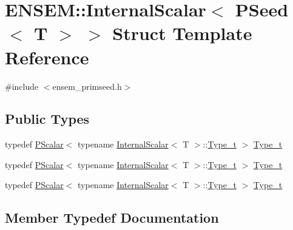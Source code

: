 \hypertarget{structENSEM_1_1InternalScalar_3_01PSeed_3_01T_01_4_01_4}{}\section{E\+N\+S\+EM\+:\+:Internal\+Scalar$<$ P\+Seed$<$ T $>$ $>$ Struct Template Reference}
\label{structENSEM_1_1InternalScalar_3_01PSeed_3_01T_01_4_01_4}


{\ttfamily \#include $<$ensem\+\_\+primseed.\+h$>$}

\subsection*{Public Types}
\begin{DoxyCompactItemize}
\item 
typedef \mbox{\hyperlink{classENSEM_1_1PScalar}{P\+Scalar}}$<$ typename \mbox{\hyperlink{structENSEM_1_1InternalScalar}{Internal\+Scalar}}$<$ T $>$\+::\mbox{\hyperlink{structENSEM_1_1InternalScalar_3_01PSeed_3_01T_01_4_01_4_af1fc242826d3ea17d7b76fd281a82eba}{Type\+\_\+t}} $>$ \mbox{\hyperlink{structENSEM_1_1InternalScalar_3_01PSeed_3_01T_01_4_01_4_af1fc242826d3ea17d7b76fd281a82eba}{Type\+\_\+t}}
\item 
typedef \mbox{\hyperlink{classENSEM_1_1PScalar}{P\+Scalar}}$<$ typename \mbox{\hyperlink{structENSEM_1_1InternalScalar}{Internal\+Scalar}}$<$ T $>$\+::\mbox{\hyperlink{structENSEM_1_1InternalScalar_3_01PSeed_3_01T_01_4_01_4_af1fc242826d3ea17d7b76fd281a82eba}{Type\+\_\+t}} $>$ \mbox{\hyperlink{structENSEM_1_1InternalScalar_3_01PSeed_3_01T_01_4_01_4_af1fc242826d3ea17d7b76fd281a82eba}{Type\+\_\+t}}
\item 
typedef \mbox{\hyperlink{classENSEM_1_1PScalar}{P\+Scalar}}$<$ typename \mbox{\hyperlink{structENSEM_1_1InternalScalar}{Internal\+Scalar}}$<$ T $>$\+::\mbox{\hyperlink{structENSEM_1_1InternalScalar_3_01PSeed_3_01T_01_4_01_4_af1fc242826d3ea17d7b76fd281a82eba}{Type\+\_\+t}} $>$ \mbox{\hyperlink{structENSEM_1_1InternalScalar_3_01PSeed_3_01T_01_4_01_4_af1fc242826d3ea17d7b76fd281a82eba}{Type\+\_\+t}}
\end{DoxyCompactItemize}


\subsection{Member Typedef Documentation}
\mbox{\label{structENSEM_1_1InternalScalar_3_01PSeed_3_01T_01_4_01_4_af1fc242826d3ea17d7b76fd281a82eba}} 
